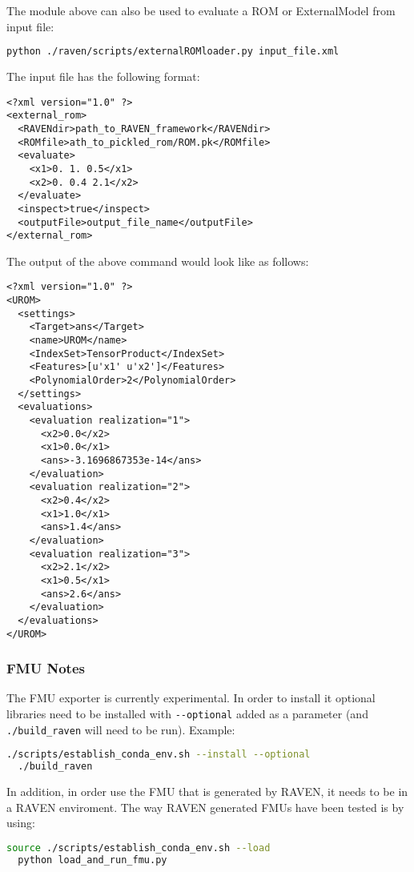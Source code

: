 The module above can also be used to evaluate a ROM or ExternalModel from input file:
\begin{lstlisting}[language=bash]
  python ./raven/scripts/externalROMloader.py input_file.xml
\end{lstlisting}
The input file has the following format:
\begin{lstlisting}[style=XML,morekeywords={class}]
<?xml version="1.0" ?>
<external_rom>
  <RAVENdir>path_to_RAVEN_framework</RAVENdir>
  <ROMfile>ath_to_pickled_rom/ROM.pk</ROMfile>
  <evaluate>
    <x1>0. 1. 0.5</x1>
    <x2>0. 0.4 2.1</x2>
  </evaluate>
  <inspect>true</inspect>
  <outputFile>output_file_name</outputFile>
</external_rom>
\end{lstlisting}
The output of the above command would look like as follows:
\begin{lstlisting}[style=XML,morekeywords={class}]
<?xml version="1.0" ?>
<UROM>
  <settings>
    <Target>ans</Target>
    <name>UROM</name>
    <IndexSet>TensorProduct</IndexSet>
    <Features>[u'x1' u'x2']</Features>
    <PolynomialOrder>2</PolynomialOrder>
  </settings>
  <evaluations>
    <evaluation realization="1">
      <x2>0.0</x2>
      <x1>0.0</x1>
      <ans>-3.1696867353e-14</ans>
    </evaluation>
    <evaluation realization="2">
      <x2>0.4</x2>
      <x1>1.0</x1>
      <ans>1.4</ans>
    </evaluation>
    <evaluation realization="3">
      <x2>2.1</x2>
      <x1>0.5</x1>
      <ans>2.6</ans>
    </evaluation>
  </evaluations>
</UROM>
\end{lstlisting}

\subsubsection{FMU Notes}
\label{subsubsec:FMUnotes}

The FMU exporter is currently experimental.  In order to install it
optional libraries need to be installed with \verb|--optional| added
as a parameter (and \verb|./build_raven| will need to be run).
Example:

\begin{lstlisting}[language=bash]
  ./scripts/establish_conda_env.sh --install --optional
  ./build_raven
\end{lstlisting}

In addition, in order use the FMU that is generated by RAVEN, it needs
to be in a RAVEN enviroment.  The way RAVEN generated FMUs have been
tested is by using:

\begin{lstlisting}[language=bash]
  source ./scripts/establish_conda_env.sh --load
  python load_and_run_fmu.py
\end{lstlisting}

